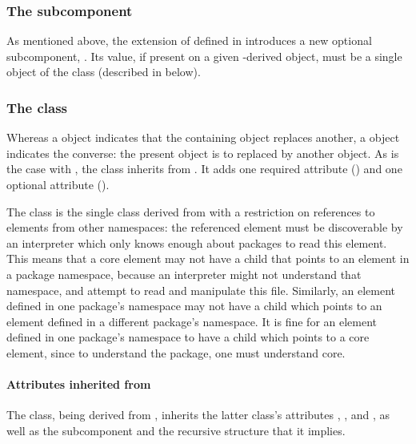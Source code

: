 \subsubsection{The \fixttspace{} subcomponent}

As mentioned above, the extension of \SBase defined in
 introduces a new optional subcomponent,
.  Its value, if present on a given \SBase-derived
object, must be a single object of the \ReplacedBy class (described in
 below).


\subsubsection{The \ReplacedBy class}
\label{replacedby-class}

Whereas a \ReplacedElement object indicates that the containing object
replaces another, a \ReplacedBy object indicates the converse: the
present object is to replaced by another object.  As is the case with
\ReplacedElement, the \ReplacedBy class inherits from \SBaseRef.  It
adds one required attribute () and one optional
attribute ().

The \ReplacedBy class is the single class derived from \SBaseRef with a
restriction on references to elements from other namespaces:  the referenced
element must be discoverable by an interpreter which only knows enough about
packages to read this element.  This means that a core element may not have
a \ReplacedBy child that points to an element in a package namespace, because
an interpreter might not understand that namespace, and attempt to read
and manipulate this file.  Similarly, an element defined in one package's
namespace may not have a \ReplacedBy child which points to an element 
defined in a different package's namespace.  It is fine for an element 
defined in one package's namespace to have a \ReplacedBy child which points 
to a core element, since to understand the package, one must understand core.


\paragraph{Attributes inherited from }

The \ReplacedBy class, being derived from \SBaseRef, inherits the latter
class's attributes , ,  and
, as well as the subcomponent  and the
recursive structure that it implies.  


